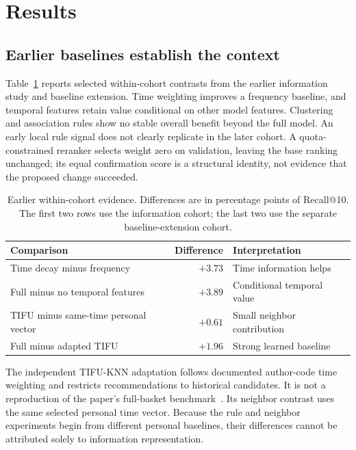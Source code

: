\section{Results}
\label{sec:results}

\subsection{Earlier baselines establish the context}
Table~\ref{tab:baselines} reports selected within-cohort contrasts from the earlier information study and baseline extension. Time weighting improves a frequency baseline, and temporal features retain value conditional on other model features. Clustering and association rules show no stable overall benefit beyond the full model. An early local rule signal does not clearly replicate in the later cohort. A quota-constrained reranker selects weight zero on validation, leaving the base ranking unchanged; its equal confirmation score is a structural identity, not evidence that the proposed change succeeded.

\begin{table}[tbp]
  \centering
  \caption{Earlier within-cohort evidence. Differences are in percentage points of Recall@10. The first two rows use the information cohort; the last two use the separate baseline-extension cohort.}
  \label{tab:baselines}
  \small
  \begin{tabularx}{\linewidth}{@{}XrX@{}}
    \toprule
    Comparison & Difference & Interpretation \\
    \midrule
    Time decay minus frequency & $+3.73$ & Time information helps \\
    Full minus no temporal features & $+3.89$ & Conditional temporal value \\
    TIFU minus same-time personal vector & $+0.61$ & Small neighbor contribution \\
    Full minus adapted TIFU & $+1.96$ & Strong learned baseline \\
    \bottomrule
  \end{tabularx}
\end{table}

The independent TIFU-KNN adaptation follows documented author-code time weighting and restricts recommendations to historical candidates. It is not a reproduction of the paper's full-basket benchmark~\citep{hu2020}. Its neighbor contrast uses the same selected personal time vector. Because the rule and neighbor experiments begin from different personal baselines, their differences cannot be attributed solely to information representation.

